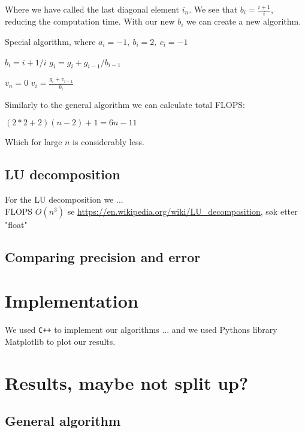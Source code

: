 \documentclass[american,a4paper,12pt]{article}
\begin{document}
Where we have called the last diagonal element $i_n$. We see that $b_i = \frac{i+1}{i}$, reducing the computation time. With our new $b_i$ we can create a new algorithm.
\begin{algorithm}
\caption{Special algorithm, where $a_i = -1,\ b_i = 2,\ c_i = -1$}
\begin{algorithmic}[1]
   
    \State $b_i = {i+1}/i$ 
    \State $g_i = g_i + {g}_{i-1}/{{b}_{i-1}}$ 
  \EndFor
    
  \Statex 
  \State $v_n = 0$ 
    \State $v_i = \frac{g_i + v_{i+1}}{b_i}$
  \EndFor
\end{algorithmic}
\end{algorithm}

Similarly to the general algorithm we can calculate total FLOPS:
\begin{center}
    $(2*2+2)(n-2)+1 = 6n-11$
\end{center}
Which for large $n$ is considerably less.
\subsection{LU decomposition}
For the LU decomposition we ...\\
FLOPS $O(n^3)$ se \url{https://en.wikipedia.org/wiki/LU_decomposition}, søk etter "float"

\subsection{Comparing precision and error}


\section{Implementation}
We used \verb!C++! to implement our algorithms ... and we used Pythons library Matplotlib to plot our results. 

\section{Results, maybe not split up?}

\subsection{General algorithm}
\end{document}

